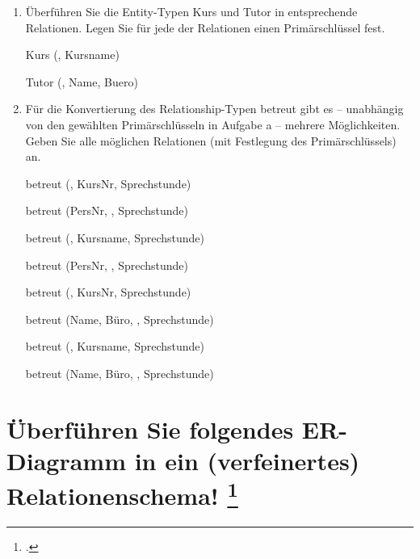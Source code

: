\documentclass{lehramt-informatik}
\begin{document}
\begin{enumerate}


\item Überführen Sie die Entity-Typen Kurs und Tutor in entsprechende
Relationen. Legen Sie für jede der Relationen einen Primärschlüssel
fest.

\begin{antwort}
\begin{rmodell}
Kurs (, Kursname)

Tutor (, Name, Buero)
\end{rmodell}
\end{antwort}


\item Für die Konvertierung des Relationship-Typen betreut gibt es –
unabhängig von den gewählten Primärschlüsseln in Aufgabe a – mehrere
Möglichkeiten. Geben Sie alle möglichen Relationen (mit Festlegung des
Primärschlüssels) an.

\begin{antwort}
\begin{rmodell}
betreut (, KursNr, Sprechstunde)

betreut (PersNr, , Sprechstunde)

betreut (, Kursname, Sprechstunde)

betreut (PersNr, , Sprechstunde)

betreut (, KursNr, Sprechstunde)

betreut (Name, Büro, , Sprechstunde)

betreut (, Kursname, Sprechstunde)

betreut (Name, Büro, , Sprechstunde)
\end{rmodell}
\end{antwort}
\end{enumerate}

%

\section{Überführen Sie folgendes ER-Diagramm in ein (verfeinertes) Relationenschema!
\footcite{db:ab:7}}
\end{document}
